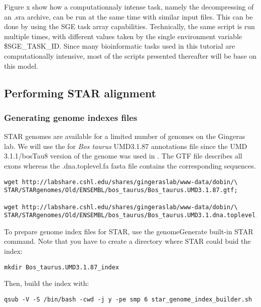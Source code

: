 Figure x show how a computationnaly intense task, namely the decompressing of an .sra archive, can be run at the same time with similar input files. This can be done by using the SGE task array capabilities. Technically, the same script is run multiple times, with different values taken by the single environment variable \$SGE\_TASK\_ID. Since many bioinformatic tasks used in this tutorial are computationally intensive, most of the scripts presented thereafter will be base on this model.


 

\subsection{Performing STAR alignment}

\subsubsection{Generating genome indexes files}

STAR genomes are available for a limited number of genomes on the Gingeras lab. We will use the for \textit{Bos taurus}  UMD3.1.87 annotations file since the UMD 3.1.1/bosTau8 version of the genome was used in \cite{Ariel2021}. The GTF file describes all exons whereas the .dna.toplevel.fa fasta file contains the corresponding sequences.



\begin{verbatim}
wget http://labshare.cshl.edu/shares/gingeraslab/www-data/dobin/\
STAR/STARgenomes/Old/ENSEMBL/bos_taurus/Bos_taurus.UMD3.1.87.gtf;

wget http://labshare.cshl.edu/shares/gingeraslab/www-data/dobin/\
STAR/STARgenomes/Old/ENSEMBL/bos_taurus/Bos_taurus.UMD3.1.dna.toplevel.fa;
\end{verbatim}

To prepare genome index files for STAR, use the genomeGenerate built-in STAR command.
Note that you have to create a directory where STAR could buid the index:

\begin{verbatim}
mkdir Bos_taurus.UMD3.1.87_index
\end{verbatim}

Then, build the index with:

\begin{verbatim}
qsub -V -S /bin/bash -cwd -j y -pe smp 6 star_genome_index_builder.sh
\end{verbatim}


